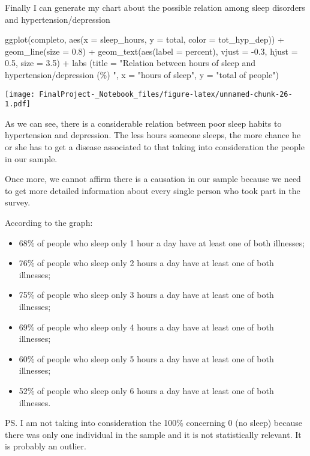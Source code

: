 \documentclass[
]{article}
\newenvironment{Shaded}{\begin{snugshade}}{\end{snugshade}}
\newcommand{\AttributeTok}[1]{\textcolor[rgb]{0.77,0.63,0.00}{#1}}
\newcommand{\FloatTok}[1]{\textcolor[rgb]{0.00,0.00,0.81}{#1}}
\newcommand{\FunctionTok}[1]{\textcolor[rgb]{0.00,0.00,0.00}{#1}}
\newcommand{\NormalTok}[1]{#1}
\newcommand{\SpecialCharTok}[1]{\textcolor[rgb]{0.00,0.00,0.00}{#1}}
\newcommand{\StringTok}[1]{\textcolor[rgb]{0.31,0.60,0.02}{#1}}
\providecommand{\tightlist}{%
  \setlength{\itemsep}{0pt}\setlength{\parskip}{0pt}}
\begin{document}
Finally I can generate my chart about the possible relation among sleep
disorders and hypertension/depression

\begin{Shaded}
\begin{Highlighting}[]
\FunctionTok{ggplot}\NormalTok{(completo, }\FunctionTok{aes}\NormalTok{(}\AttributeTok{x =}\NormalTok{ sleep\_hours, }\AttributeTok{y =}\NormalTok{ total, }\AttributeTok{color =}\NormalTok{ tot\_hyp\_dep)) }\SpecialCharTok{+}
  \FunctionTok{geom\_line}\NormalTok{(}\AttributeTok{size =} \FloatTok{0.8}\NormalTok{) }\SpecialCharTok{+}
  \FunctionTok{geom\_text}\NormalTok{(}\FunctionTok{aes}\NormalTok{(}\AttributeTok{label =}\NormalTok{ percent), }\AttributeTok{vjust =} \SpecialCharTok{{-}}\FloatTok{0.3}\NormalTok{, }\AttributeTok{hjust =} \FloatTok{0.5}\NormalTok{, }\AttributeTok{size =} \FloatTok{3.5}\NormalTok{) }\SpecialCharTok{+}
  \FunctionTok{labs}\NormalTok{ (}\AttributeTok{title =} \StringTok{"Relation between hours of sleep and hypertension/depression (\%) "}\NormalTok{,}
        \AttributeTok{x =} \StringTok{"hours of sleep"}\NormalTok{,}
        \AttributeTok{y =} \StringTok{"total of people"}\NormalTok{) }
\end{Highlighting}
\end{Shaded}

\texttt{[image: FinalProject-\_Notebook\_files/figure-latex/unnamed-chunk-26-1.pdf]}

As we can see, there is a considerable relation between poor sleep
habits to hypertension and depression. The less hours someone sleeps,
the more chance he or she has to get a disease associated to that taking
into consideration the people in our sample.

Once more, we cannot affirm there is a causation in our sample because
we need to get more detailed information about every single person who
took part in the survey.

According to the graph:

\begin{itemize}
\tightlist
\item
  68\% of people who sleep only 1 hour a day have at least one of both
  illnesses;
\item
  76\% of people who sleep only 2 hours a day have at least one of both
  illnesses;
\item
  75\% of people who sleep only 3 hours a day have at least one of both
  illnesses;
\item
  69\% of people who sleep only 4 hours a day have at least one of both
  illnesses;
\item
  60\% of people who sleep only 5 hours a day have at least one of both
  illnesses;
\item
  52\% of people who sleep only 6 hours a day have at least one of both
  illnesses.
\end{itemize}

PS. I am not taking into consideration the 100\% concerning 0 (no sleep)
because there was only one individual in the sample and it is not
statistically relevant. It is probably an outlier.
\end{document}
